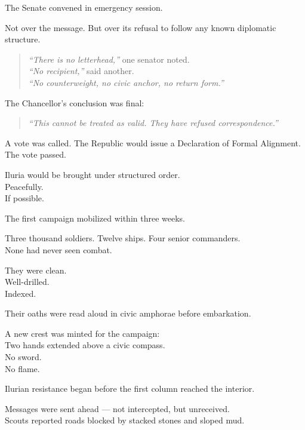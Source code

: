 \documentclass[12pt]{article}
\begin{document}
\vspace{1em}

The Senate convened in emergency session.

Not over the message. But over its refusal to follow any known diplomatic structure.

\begin{quote}
\textit{“There is no letterhead,”} one senator noted.\\
\textit{“No recipient,”} said another.\\
\textit{“No counterweight, no civic anchor, no return form.”}
\end{quote}

The Chancellor’s conclusion was final:

\begin{quote}
\textit{“This cannot be treated as valid. They have refused correspondence.”}
\end{quote}

A vote was called. The Republic would issue a Declaration of Formal Alignment. The vote passed.

Iluria would be brought under structured order.\\
Peacefully.\\
If possible.

\vspace{1em}

The first campaign mobilized within three weeks.

Three thousand soldiers. Twelve ships. Four senior commanders.\\
None had never seen combat.

They were clean.\\
Well-drilled.\\
Indexed.

Their oaths were read aloud in civic amphorae before embarkation.

A new crest was minted for the campaign:\\
Two hands extended above a civic compass.\\
No sword.\\
No flame.

\vspace{1em}

Ilurian resistance began before the first column reached the interior.

Messages were sent ahead --- not intercepted, but unreceived.\\
Scouts reported roads blocked by stacked stones and sloped mud.
\end{document}
